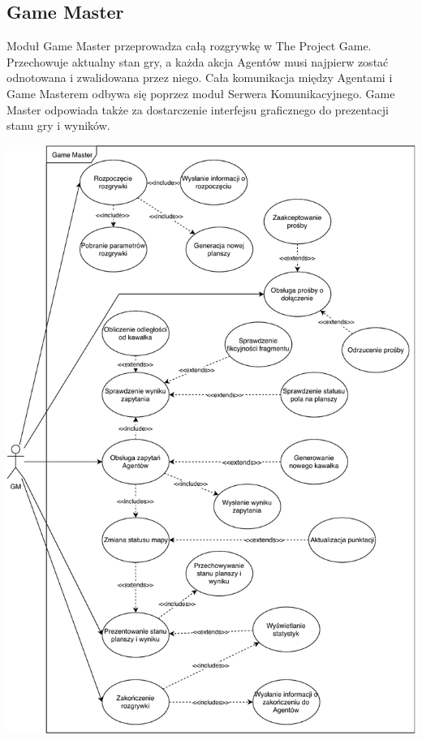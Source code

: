 \documentclass[../Dokumentacja.tex]{subfiles}
\begin{document}
\subsection{Game Master}
Moduł Game Master przeprowadza całą rozgrywkę w The Project Game. Przechowuje aktualny stan gry,
a każda akcja Agentów musi najpierw zostać odnotowana i zwalidowana przez niego.
Cała komunikacja między Agentami i Game Masterem odbywa się poprzez moduł Serwera Komunikacyjnego.
Game Master odpowiada także za dostarczenie interfejsu graficznego do prezentacji stanu gry i wyników.

\includegraphics[width=\textwidth]{resources/GM-GM.pdf}
\end{document}
